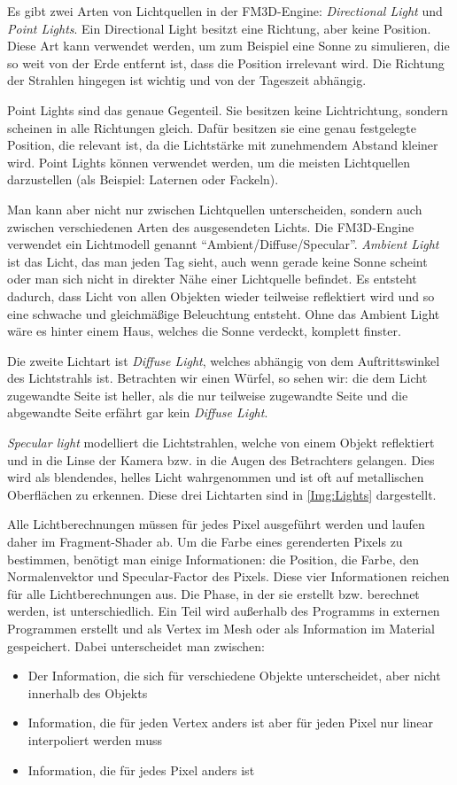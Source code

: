 Es gibt zwei Arten von Lichtquellen in der FM3D-Engine: \textit{Directional Light} und \textit{Point Lights}. Ein Directional Light besitzt eine Richtung, aber keine Position. Diese Art kann verwendet werden, um zum Beispiel eine Sonne zu simulieren, die so weit von der Erde entfernt ist, dass die Position irrelevant wird. Die Richtung der Strahlen hingegen ist wichtig und von der Tageszeit abhängig. 

Point Lights sind das genaue Gegenteil. Sie besitzen keine Lichtrichtung, sondern scheinen in alle Richtungen gleich. Dafür besitzen sie eine genau festgelegte Position, die relevant ist, da die Lichtstärke mit zunehmendem Abstand kleiner wird. Point Lights können verwendet werden, um die meisten Lichtquellen darzustellen (als Beispiel: Laternen oder Fackeln).

Man kann aber nicht nur zwischen Lichtquellen unterscheiden, sondern auch zwischen verschiedenen Arten des ausgesendeten Lichts. Die \ac{FM3D}-Engine verwendet ein Lichtmodell genannt "`Ambient/Diffuse/Specular"'. 
\textit{Ambient Light} ist das Licht, das man jeden Tag sieht, auch wenn gerade keine Sonne scheint oder man sich nicht in direkter Nähe einer Lichtquelle befindet. 
Es entsteht dadurch, dass Licht von allen Objekten wieder teilweise reflektiert wird und so eine schwache und gleichmäßige Beleuchtung entsteht. Ohne das Ambient Light wäre es hinter einem Haus, welches die Sonne verdeckt, komplett finster. 

Die zweite Lichtart ist \textit{Diffuse Light}, welches abhängig von dem Auftrittswinkel des Lichtstrahls ist. Betrachten wir einen Würfel, so sehen wir: 
die dem Licht zugewandte Seite ist heller, als die nur teilweise zugewandte Seite und die abgewandte Seite erfährt gar kein \textit{Diffuse Light}. 

\textit{Specular light} modelliert die Lichtstrahlen, welche von einem Objekt reflektiert und in die Linse der Kamera bzw. in die Augen des Betrachters gelangen. Dies wird als blendendes, helles Licht wahrgenommen und ist oft auf metallischen Oberflächen zu erkennen. Diese drei Lichtarten sind in \cref{Img:Lights} dargestellt.

Alle Lichtberechnungen müssen für jedes Pixel ausgeführt werden und laufen daher im Fragment-Shader ab.
Um die Farbe eines gerenderten Pixels zu bestimmen, benötigt man einige Informationen: die Position, die Farbe, den Normalenvektor und Specular-Factor des Pixels. Diese vier Informationen reichen für alle Lichtberechnungen aus. Die Phase, in der sie erstellt bzw. berechnet werden, ist unterschiedlich. Ein Teil wird außerhalb des Programms in externen Programmen erstellt und als Vertex im Mesh oder als Information im Material gespeichert. Dabei unterscheidet man zwischen:
\begin{itemize}
	\item Der Information, die sich für verschiedene Objekte unterscheidet, aber nicht innerhalb des Objekts
	\item Information, die für jeden Vertex anders ist aber für jeden Pixel nur linear interpoliert werden muss
	\item Information, die für jedes Pixel anders ist
\end{itemize}

